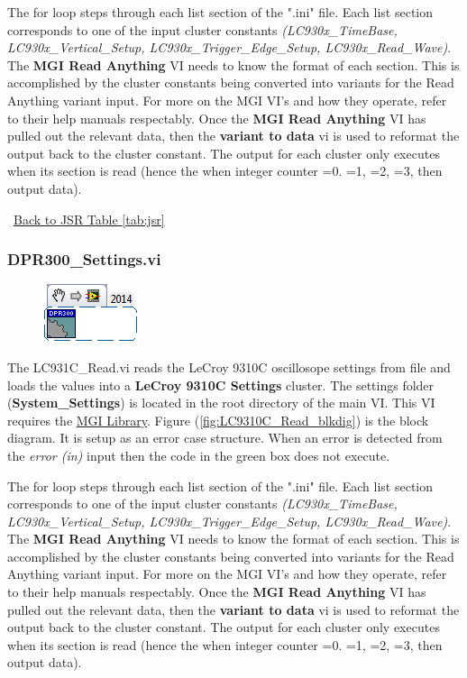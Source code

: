 \documentclass[11pt,a4paper,oldfontcommands]{memoir}
\begin{document}
The for loop steps through each list section of the ".ini" file. Each list section corresponds to one of the input cluster constants \textit{(LC930x\_TimeBase, LC930x\_Vertical\_Setup, LC930x\_Trigger\_Edge\_Setup, LC930x\_Read\_Wave)}. The \textbf{MGI Read Anything} VI needs to know the format of each section. This is accomplished by the cluster constants being converted into variants for the Read Anything variant input.  For more on the MGI VI's and how they operate, refer to their help manuals respectably. Once the \textbf{MGI Read Anything} VI has pulled out the relevant data, then the \textbf{variant to data} vi is used to reformat the output back to the cluster constant. The output for each cluster only executes when its section is read (hence the when integer counter =0. =1, =2, =3, then output data).

\noindent\hrulefill\, \hyperref[tab:jsr]{Back to JSR Table \ref{tab:jsr}}

\subsubsection{DPR300\_Settings.vi} \label{DPR300_settings}
\noindent\hrulefill

\begin{figure}[h]
	\includegraphics[scale=0.625]{DPR300_settings_main_01}
	\label{fig:DPR300_settings_main_01}
\end{figure}

The LC931C\_Read.vi reads the LeCroy 9310C oscillosope settings from file and loads the values into a \textbf{LeCroy 9310C Settings} cluster. The settings folder (\textbf{System\_Settings}) is located in the root directory of the main VI. This VI requires the \href{http://sine.ni.com/nips/cds/view/p/lang/en/nid/209753}{MGI Library}. Figure (\ref{fig:LC9310C_Read_blkdig}) is the block diagram.  It is setup as an error case structure. When an error is detected from the \textit{error (in)} input then the code in the green box does not execute.

The for loop steps through each list section of the ".ini" file. Each list section corresponds to one of the input cluster constants \textit{(LC930x\_TimeBase, LC930x\_Vertical\_Setup, LC930x\_Trigger\_Edge\_Setup, LC930x\_Read\_Wave)}. The \textbf{MGI Read Anything} VI needs to know the format of each section. This is accomplished by the cluster constants being converted into variants for the Read Anything variant input.  For more on the MGI VI's and how they operate, refer to their help manuals respectably. Once the \textbf{MGI Read Anything} VI has pulled out the relevant data, then the \textbf{variant to data} vi is used to reformat the output back to the cluster constant. The output for each cluster only executes when its section is read (hence the when integer counter =0. =1, =2, =3, then output data).
\end{document}
